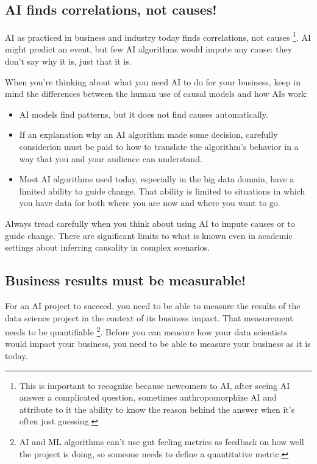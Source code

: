 \subsection{AI finds correlations, not causes!}
AI as practiced in business and industry today finds correlations,
not causes
\footnote{
    This is important to recognize because newcomers to AI, after
    seeing AI answer a complicated question, sometimes
    anthropomorphize AI and attribute to it the ability to know
    the reason behind the answer when it's often just guessing.
}.
AI might predict an event, but few AI algorithms would impute any
cause: they don't say why it is, just that it is.

When you're thinking about what you need AI to do for your
business, keep in mind the differences between the human use of
causal models and how AIs work:
\begin{itemize}
    \item AI models find patterns, but it does not find causes
    automatically.

    \item If an explanation why an AI algorithm made some decision,
    carefully considerion must be paid to how to translate the
    algorithm's behavior in a way that you and your audience can
    understand.

    \item Most AI algorithms used today, especially in the big
    data domain, have a limited ability to guide change.
    That ability is limited to situations in which you have
    data for both where you are now and where you want to go.
\end{itemize}

Always tread carefully when you think about using AI to impute
causes or to guide change. There are significant limits to what is
known even in academic settings about inferring causality in
complex scenarios.


\subsection{Business results must be measurable!}
For an AI project to succeed, you need to be able to measure the
results of the data science project in the context of its business
impact. That measurement needs to be quantifiable
\footnote{
    AI and ML algorithms can't use gut feeling metrics as
    feedback on how well the project is doing, so someone needs
    to define a quantitative metric.
}.
Before you can measure how your data scientists would impact your
business, you need to be able to measure your business as it is
today.

